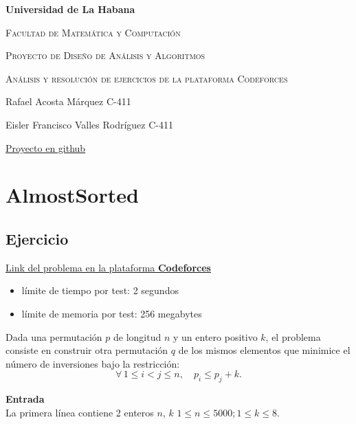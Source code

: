 ﻿\documentclass{article}
\theoremstyle{plain}
\theoremstyle{definition}
\begin{document}
\begin{titlepage}
    \centering
    {\bfseries\LARGE Universidad de La Habana \par}
    \vspace{1cm}
    {\scshape\Large Facultad de Matemática y Computación \par}
    \vspace{3cm}
    {\scshape\Huge Proyecto de Diseño de Análisis y Algoritmos\par}
    \vspace{1cm}
    {\scshape\Large Análisis y resolución de ejercicios de la plataforma Codeforces\par}
    \vfill

    {\Large Rafael Acosta Márquez C-411 \par}
    {\Large Eisler Francisco Valles Rodríguez C-411}
    \vfill
    {\href{Poner enlace de github}{Proyecto en github} \par}
\end{titlepage}

\tableofcontents

\newpage

\section{AlmostSorted}

\subsection{Ejercicio}

\href{https://codeforces.com/problemset/problem/1730/F}{Link del problema en la plataforma \textbf{Codeforces}}

\begin{itemize}
    \item límite de tiempo por test: 2 segundos
    \item límite de memoria por test: 256 megabytes
\end{itemize}
Dada una permutación $p$ de longitud $n$ y un entero positivo $k$, el problema consiste en construir otra permutación $q$ de los mismos elementos que minimice el número de inversiones bajo la restricción:
\begin{equation}
    \forall\, 1 \leq i < j \leq n, \quad p_i \leq p_j + k.
\end{equation}

\textbf{Entrada}\\

La primera línea contiene 2 enteros $n$, $k$ $1 \leq n \leq 5000; 1 \leq k \leq 8$.
\end{document}
